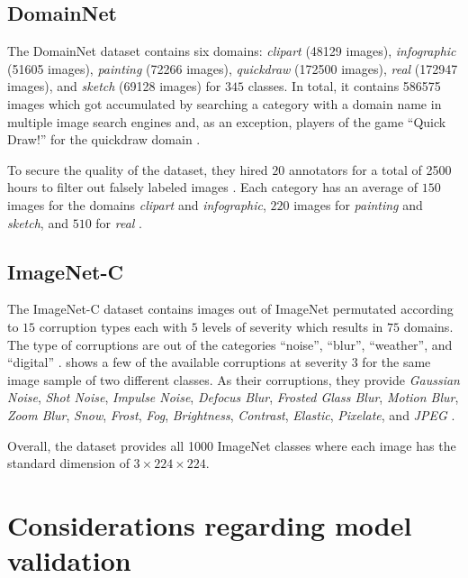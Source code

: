 \subsection{DomainNet}

The DomainNet dataset \citep{PengBXHSW19} contains six domains: \emph{clipart} (\num{48129} images), \emph{infographic} (\num{51605} images), \emph{painting} (\num{72266} images), \emph{quickdraw} (\num{172500} images), \emph{real} (\num{172947} images), and \emph{sketch} (\num{69128} images) for $345$ classes. In total, it contains \num{586575} images  which got accumulated by searching a category with a domain name in multiple image search engines and, as an exception, players of the game ``Quick Draw!'' for the quickdraw domain \citep{PengBXHSW19}.

To secure the quality of the dataset, they hired $20$ annotators for a total of \num{2500} hours to filter out falsely labeled images \citep{PengBXHSW19}. Each category has an average of $150$ images for the domains \emph{clipart} and \emph{infographic}, $220$ images for \emph{painting} and \emph{sketch}, and $510$ for \emph{real} \citep{PengBXHSW19}.

\subsection{ImageNet-C}
The ImageNet-C dataset \citep{HendrycksD19} contains images out of ImageNet \citep{RussakovskyDSKS15} permutated according to $15$ corruption types each with $5$ levels of severity which results in $75$ domains. The type of corruptions are out of the categories ``noise'', ``blur'', ``weather'', and ``digital'' \citep{HendrycksD19}.  shows a few of the available corruptions at severity $3$ for the same image sample of two different classes. As their corruptions, they provide \emph{Gaussian Noise}, \emph{Shot Noise}, \emph{Impulse Noise}, \emph{Defocus Blur}, \emph{Frosted Glass Blur}, \emph{Motion Blur}, \emph{Zoom Blur}, \emph{Snow}, \emph{Frost}, \emph{Fog}, \emph{Brightness}, \emph{Contrast}, \emph{Elastic}, \emph{Pixelate}, and \emph{JPEG} \citep{HendrycksD19}. 

Overall, the dataset provides all \num{1000} ImageNet classes where each image has the standard dimension of $3 \times 224 \times 224$.

\section{Considerations regarding model validation}

